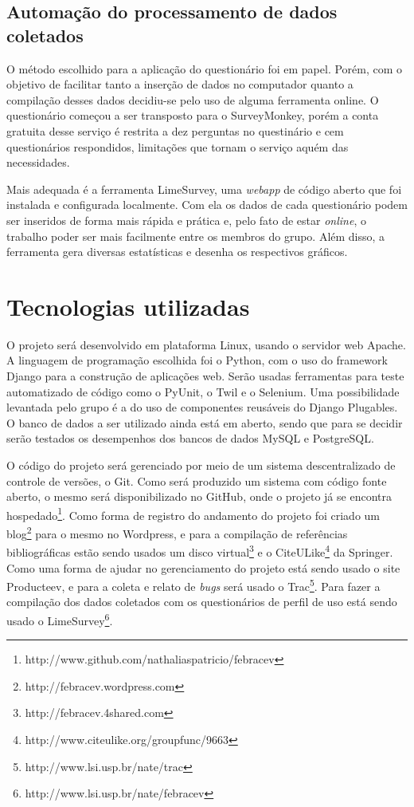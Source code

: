 \documentclass[a4paper,12pt,font=plain,header=plain]{abnt}
\begin{document}
    \section{Automação do processamento de dados coletados}
      O método escolhido para a aplicação do questionário foi em papel. Porém, com o objetivo de facilitar tanto a inserção de dados no computador quanto a compilação desses dados decidiu-se pelo uso de alguma ferramenta online. O questionário começou a ser transposto para o SurveyMonkey, porém a conta gratuita desse serviço é restrita a dez perguntas no questinário e cem questionários respondidos, limitações que tornam o serviço aquém das necessidades.

      Mais adequada é a ferramenta LimeSurvey, uma \textit{webapp} de código aberto que foi instalada e configurada localmente. Com ela os dados de cada questionário podem ser inseridos de forma mais rápida e prática e, pelo fato de estar \textit{online}, o trabalho poder ser mais facilmente entre os membros do grupo. Além disso, a ferramenta gera diversas estatísticas e desenha os respectivos gráficos.

	\chapter{Tecnologias utilizadas}

	O projeto será desenvolvido em plataforma Linux, usando o servidor web Apache. A linguagem de programação escolhida foi o Python, com o uso do framework Django para a construção de aplicações web. Serão usadas ferramentas para teste automatizado de código como o PyUnit, o Twil e o Selenium. Uma possibilidade levantada pelo grupo é a do uso de componentes reusáveis do Django Plugables. O banco de dados a ser utilizado ainda está em aberto, sendo que para se decidir serão testados os desempenhos dos bancos de dados MySQL e PostgreSQL.

	O código do projeto será gerenciado por meio de um sistema descentralizado de controle de versões, o Git. Como será produzido um sistema com código fonte aberto, o mesmo será disponibilizado no GitHub, onde o projeto já se encontra hospedado\footnote{http://www.github.com/nathaliaspatricio/febracev}. Como forma de registro do andamento do projeto foi criado um blog\footnote{http://febracev.wordpress.com} para o mesmo no Wordpress, e para a compilação de referências bibliográficas estão sendo usados um disco virtual\footnote{http://febracev.4shared.com} e o CiteULike\footnote{http://www.citeulike.org/groupfunc/9663} da Springer. Como uma forma de ajudar no gerenciamento do projeto está sendo usado o site Producteev, e para a coleta e relato de \textit{bugs} será usado o Trac\footnote{http://www.lsi.usp.br/nate/trac}. Para fazer a compilação dos dados coletados com os questionários de perfil de uso está sendo usado o LimeSurvey\footnote{http://www.lsi.usp.br/nate/febracev}.
\end{document}
